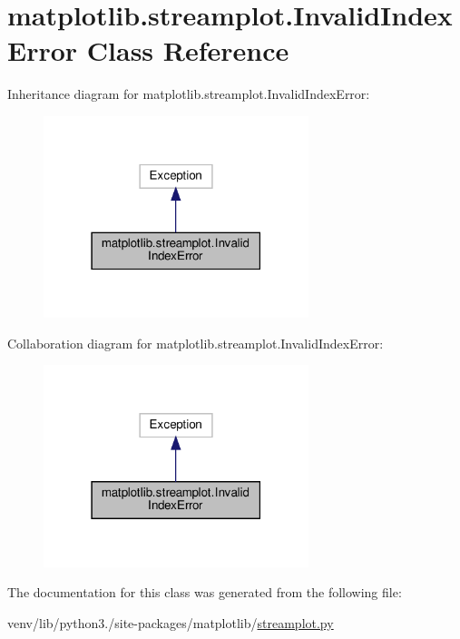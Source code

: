 \hypertarget{classmatplotlib_1_1streamplot_1_1InvalidIndexError}{}\section{matplotlib.\+streamplot.\+Invalid\+Index\+Error Class Reference}
\label{classmatplotlib_1_1streamplot_1_1InvalidIndexError}


Inheritance diagram for matplotlib.\+streamplot.\+Invalid\+Index\+Error\+:
\nopagebreak
\begin{figure}[H]
\begin{center}
\leavevmode
\includegraphics[width=219pt]{classmatplotlib_1_1streamplot_1_1InvalidIndexError__inherit__graph}
\end{center}
\end{figure}


Collaboration diagram for matplotlib.\+streamplot.\+Invalid\+Index\+Error\+:
\nopagebreak
\begin{figure}[H]
\begin{center}
\leavevmode
\includegraphics[width=219pt]{classmatplotlib_1_1streamplot_1_1InvalidIndexError__coll__graph}
\end{center}
\end{figure}


The documentation for this class was generated from the following file\+:\begin{DoxyCompactItemize}
\item 
venv/lib/python3./site-\/packages/matplotlib/\hyperlink{streamplot_8py}{streamplot.\+py}\end{DoxyCompactItemize}
